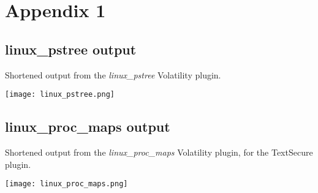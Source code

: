 \section{Appendix 1}

\subsection{linux\_pstree output}\label{pstree}
Shortened output from the \textit{linux\_pstree} Volatility plugin.

\texttt{[image: linux\_pstree.png]}


\subsection{linux\_proc\_maps output}\label{procmaps}
Shortened output from the \textit{linux\_proc\_maps} Volatility plugin, for the
TextSecure plugin.

\texttt{[image: linux\_proc\_maps.png]}
